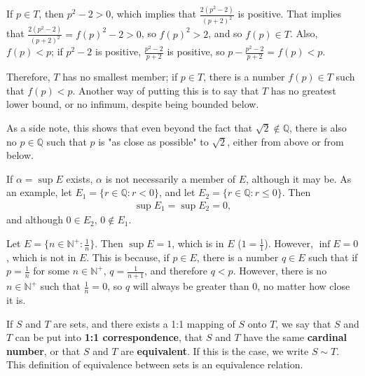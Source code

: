 \documentclass[12pt]{article}
\begin{document}
\begin{exm}
  If $p \in T$, then $p^2 - 2 > 0$, which implies that $\frac{2(p^2 - 2)}{(p + 2)^2}$
  is positive. That implies that $\frac{2(p^2 - 2)}{(p + 2)^2} = f(p)^2 - 2 > 0$, so
  $f(p)^2 > 2$, and so $f(p) \in T$. Also, $f(p) < p$; if $p^2 - 2$ is positive,
  $\frac{p^2 - 2}{p + 2}$ is positive, so $p - \frac{p^2 - 2}{p + 2} = f(p) < p$.

  Therefore, $T$ has no smallest member; if $p \in T$, there is a number $f(p) \in T$
  such that $f(p) < p$. Another way of putting this is to say that $T$ has no
  greatest lower bound, or no infimum, despite being bounded below.

  As a side note, this shows that even beyond the fact that $\sqrt{2} \notin
  \mathbb{Q}$, there is also no $p \in \mathbb{Q}$ such that $p$ is "as close as
  possible" to $\sqrt{2}$, either from above or from below.
\end{exm}

\begin{exm}
  If $\alpha = \sup E$ exists, $\alpha$ is not necessarily a member of $E$, although
  it may be. As an example, let $E_1 = \{r \in \mathbb{Q}: r < 0\}$, and let $E_2 =
  \{r \in \mathbb{Q}: r \leq 0\}$. Then
  \begin{align*}
    \sup E_1 = \sup E_2 = 0,
  \end{align*}
  and although $0 \in E_2$, $0 \notin E_1$.
\end{exm}

\begin{exm}
  Let $E = \{n \in \mathbb{N}^+: \frac{1}{n}\}$. Then $\sup E = 1$, which is in $E$
  ($1 = \frac{1}{1}$).  However, $\inf E = 0$, which is not in $E$. This is because,
  if $p \in E$, there is a number $q \in E$ such that if $p = \frac{1}{n}$ for some
  $n \in \mathbb{N}^+$, $q = \frac{1}{n + 1}$, and therefore $q < p$. However, there
  is no $n \in \mathbb{N}^+$ such that $\frac{1}{n} = 0$, so $q$ will always be
  greater than $0$, no matter how close it is.
\end{exm}

\begin{defn}
  If $S$ and $T$ are sets, and there exists a 1:1 mapping of $S$ onto $T$, we say
  that $S$ and $T$ can be put into \textbf{1:1 correspondence}, that $S$ and $T$ have
  the same \textbf{cardinal number}, or that $S$ and $T$ are \textbf{equivalent}. If
  this is the case, we write $S \sim T$. This definition of equivalence between sets
  is an equivalence relation.
\end{defn}
\end{document}
